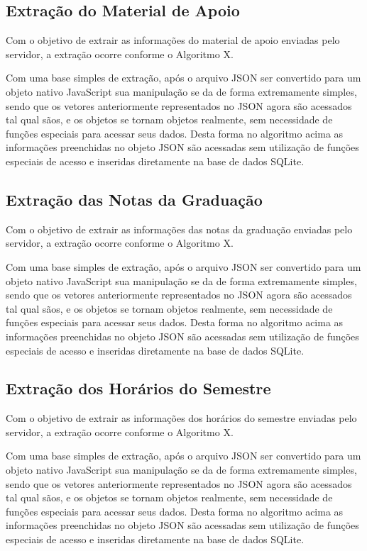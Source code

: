 \subsection{Extração do Material de Apoio}
Com o objetivo de extrair as informações do material de apoio enviadas pelo servidor, a extração ocorre conforme o Algoritmo X.


Com uma base simples de extração, após o arquivo JSON ser convertido para um objeto nativo JavaScript sua manipulação se da de forma extremamente simples, sendo que os vetores anteriormente representados no JSON agora são acessados tal qual sãos, e os objetos se tornam objetos realmente, sem necessidade de funções especiais para acessar seus dados. Desta forma no algoritmo acima as informações preenchidas no objeto JSON são acessadas sem utilização de funções especiais de acesso e inseridas diretamente na base de dados SQLite.

\subsection{Extração das Notas da Graduação}
Com o objetivo de extrair as informações das notas da graduação enviadas pelo servidor, a extração ocorre conforme o Algoritmo X.


Com uma base simples de extração, após o arquivo JSON ser convertido para um objeto nativo JavaScript sua manipulação se da de forma extremamente simples, sendo que os vetores anteriormente representados no JSON agora são acessados tal qual sãos, e os objetos se tornam objetos realmente, sem necessidade de funções especiais para acessar seus dados. Desta forma no algoritmo acima as informações preenchidas no objeto JSON são acessadas sem utilização de funções especiais de acesso e inseridas diretamente na base de dados SQLite.
\subsection{Extração dos Horários do Semestre}
Com o objetivo de extrair as informações dos horários do semestre enviadas pelo servidor, a extração ocorre conforme o Algoritmo X.


Com uma base simples de extração, após o arquivo JSON ser convertido para um objeto nativo JavaScript sua manipulação se da de forma extremamente simples, sendo que os vetores anteriormente representados no JSON agora são acessados tal qual sãos, e os objetos se tornam objetos realmente, sem necessidade de funções especiais para acessar seus dados. Desta forma no algoritmo acima as informações preenchidas no objeto JSON são acessadas sem utilização de funções especiais de acesso e inseridas diretamente na base de dados SQLite.

